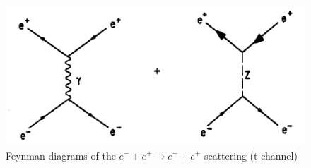 \begin{figure}[hb]
	\centering
	\includegraphics{graphics/BhabbaStreuung.png}
	\caption{Feynman diagrams of the $e^- + e^+ \rightarrow e^- + e^+$ scattering (t-channel)}
	\label{fig:principles:BhabbaStreuung.png}
\end{figure}
 